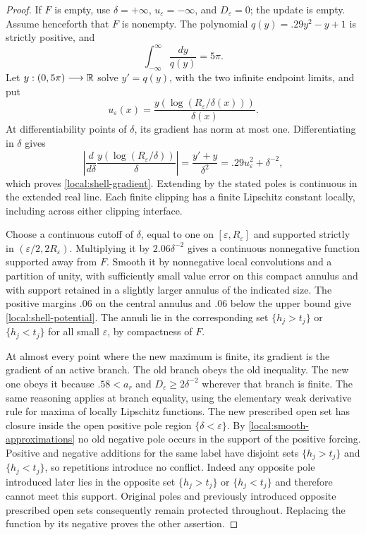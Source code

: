 \begin{proof}
If $F$ is empty, use $\delta=+\infty$, $u_\varepsilon=-\infty$,
and $D_\varepsilon=0$; the update is empty. Assume henceforth that
$F$ is nonempty. The polynomial
$q(y)=.29y^2-y+1$ is strictly positive, and
\[
 \int_{-\infty}^{\infty}\frac{dy}{q(y)}=5\pi.
\]
Let $y:(0,5\pi)\longrightarrow\mathbb R$ solve $y'=q(y)$, with the two
infinite endpoint limits, and put
\[
 u_\varepsilon(x)=\frac{y(\log(R_\varepsilon/\delta(x)))}{\delta(x)}.
\]
At differentiability points of $\delta$, its gradient has norm at
most one.  Differentiating in $\delta$ gives
\[
 \left|\frac{d}{d\delta}\frac{y(\log(R_\varepsilon/\delta))}{\delta}\right|
   =\frac{y'+y}{\delta^2}
   =.29u_\varepsilon^2+\delta^{-2},
\]
which proves \eqref{local:shell-gradient}.  Extending by the stated
poles is continuous in the extended real line.  Each finite clipping
has a finite Lipschitz constant locally, including across either
clipping interface.

Choose a continuous cutoff of $\delta$, equal to one on
$[\varepsilon,R_\varepsilon]$ and supported strictly in
$(\varepsilon/2,2R_\varepsilon)$.  Multiplying it by
$2.06\delta^{-2}$ gives a continuous nonnegative function supported
away from $F$.  Smooth it by nonnegative local convolutions and a
partition of unity, with sufficiently small value error on this
compact annulus and with support retained in a slightly larger
annulus of the indicated size.  The positive margins $.06$ on the
central annulus and $.06$ below the upper bound give
\eqref{local:shell-potential}.  The annuli lie in the corresponding set $\{h_j>t_j\}$ or $\{h_j<t_j\}$ for all small $\varepsilon$, by compactness of $F$.

At almost every point where the new maximum is finite, its gradient
is the gradient of an active branch.  The old branch obeys the old
inequality.  The new one obeys it because $.58<a_r$ and
$D_\varepsilon\ge2\delta^{-2}$ wherever that branch is finite.
The same reasoning applies at branch equality, using the elementary
weak derivative rule for maxima of locally Lipschitz functions.
The new prescribed open set has closure inside the open positive pole region
$\{\delta<\varepsilon\}$.  By \cref{local:smooth-approximations} no old negative
pole occurs in the support of the positive forcing.  Positive and
negative additions for the same label have disjoint sets $\{h_j>t_j\}$ and $\{h_j<t_j\}$, so repetitions introduce no conflict.  Indeed any opposite
pole introduced later lies in the opposite set $\{h_j>t_j\}$ or $\{h_j<t_j\}$ and
therefore cannot meet this support.  Original poles and previously
introduced opposite prescribed open sets consequently remain protected throughout.
Replacing the function by its negative proves the other assertion.
\end{proof}

